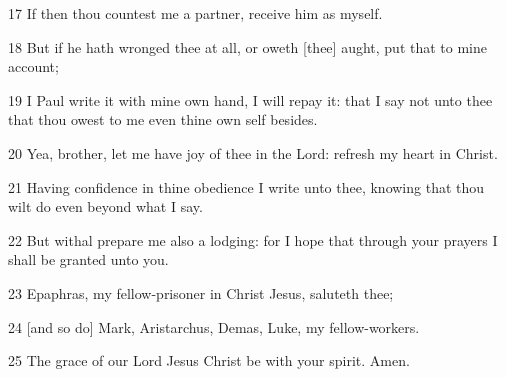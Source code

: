 \par 17 If then thou countest me a partner, receive him as myself.
\par 18 But if he hath wronged thee at all, or oweth [thee] aught, put that to mine account;
\par 19 I Paul write it with mine own hand, I will repay it: that I say not unto thee that thou owest to me even thine own self besides.
\par 20 Yea, brother, let me have joy of thee in the Lord: refresh my heart in Christ.
\par 21 Having confidence in thine obedience I write unto thee, knowing that thou wilt do even beyond what I say.
\par 22 But withal prepare me also a lodging: for I hope that through your prayers I shall be granted unto you.
\par 23 Epaphras, my fellow-prisoner in Christ Jesus, saluteth thee;
\par 24 [and so do] Mark, Aristarchus, Demas, Luke, my fellow-workers.
\par 25 The grace of our Lord Jesus Christ be with your spirit. Amen.

